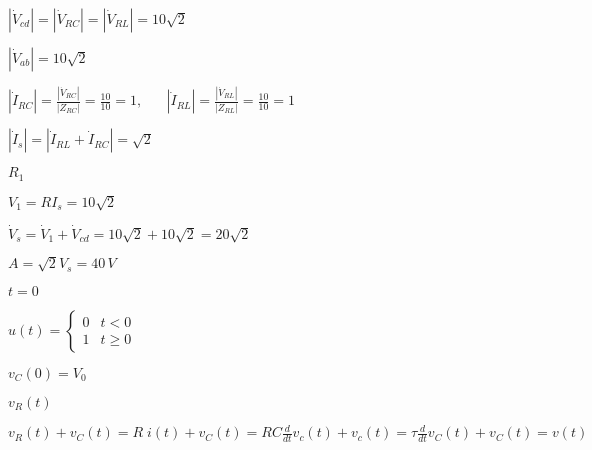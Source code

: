 \documentclass{article}
\def\lthtmlcheckvsize{\ifdim\ht\sizebox<\vsize 
  \ifdim\wd\sizebox<\hsize\expandafter\hfill\fi \expandafter\vfill
  \else\expandafter\vss\fi}%
\begin{document}
{\newpage\clearpage
{}%
$ |\dot{V}_{cd}|=|\dot{V}_{RC}|=|\dot{V}_{RL}|=10\sqrt{2}$%
\lthtmlindisplaymathZ
\lthtmlcheckvsize\clearpage}

{\newpage\clearpage
{}%
$ |\dot{V}_{ab}|=10\sqrt{2}$%
\lthtmlindisplaymathZ
\lthtmlcheckvsize\clearpage}

{\newpage\clearpage
{}%
$\displaystyle |\dot{I}_{RC}|=\frac{|\dot{V}_{RC}|}{|Z_{RC}|}=\frac{10}{10}=1,
\;\;\;\;\;\;
|\dot{I}_{RL}|=\frac{|\dot{V}_{RL}|}{|Z_{RL}|}=\frac{10}{10}=1$%
\lthtmlindisplaymathZ
\lthtmlcheckvsize\clearpage}

{\newpage\clearpage
{}%
$\displaystyle |\dot{I}_s|=|\dot{I}_{RL}+\dot{I}_{RC}|=\sqrt{2}$%
\lthtmlindisplaymathZ
\lthtmlcheckvsize\clearpage}

{\newpage\clearpage
{}%
$ R_1$%
\lthtmlindisplaymathZ
\lthtmlcheckvsize\clearpage}

{\newpage\clearpage
{}%
$ V_1=RI_s=10\sqrt{2}$%
\lthtmlindisplaymathZ
\lthtmlcheckvsize\clearpage}

{\newpage\clearpage
{}%
$\displaystyle \dot{V}_s=\dot{V}_1+\dot{V}_{cd}=10\sqrt{2}+10\sqrt{2}=20\sqrt{2}$%
\lthtmlindisplaymathZ
\lthtmlcheckvsize\clearpage}

{\newpage\clearpage
{}%
$ A=\sqrt{2} V_s=40\,V$%
\lthtmlindisplaymathZ
\lthtmlcheckvsize\clearpage}

{\newpage\clearpage
{}%
$ t=0$%
\lthtmlindisplaymathZ
\lthtmlcheckvsize\clearpage}

{\newpage\clearpage
{}%
$\displaystyle u(t)=\left\{\begin{array}{ll}0&t<0\\1&t\ge 0\end{array}\right.$%
\lthtmlindisplaymathZ
\lthtmlcheckvsize\clearpage}

{\newpage\clearpage
{}%
$ v_C(0)=V_0$%
\lthtmlindisplaymathZ
\lthtmlcheckvsize\clearpage}

{\newpage\clearpage
{}%
$ v_R(t)$%
\lthtmlindisplaymathZ
\lthtmlcheckvsize\clearpage}

{\newpage\clearpage
{}%
$\displaystyle v_R(t)+v_C(t)=R\;i(t)+v_C(t)=RC\frac{d}{dt} v_c(t)+v_c(t)
=\tau \frac{d}{dt} v_C(t)+v_C(t)=v(t)$%
\lthtmlindisplaymathZ
\lthtmlcheckvsize\clearpage}
\end{document}

